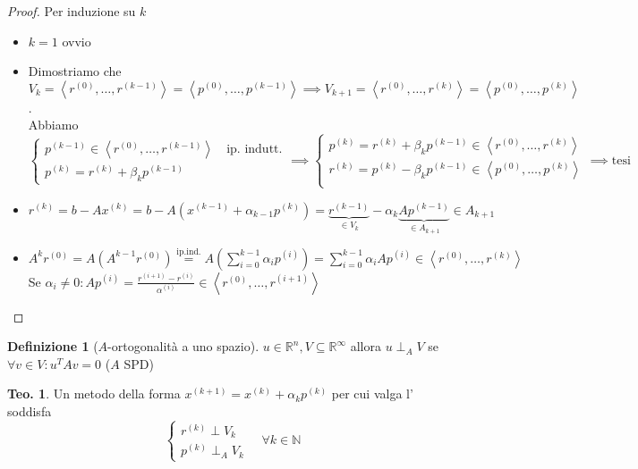 \documentclass[a4paper,10pt]{article}
\theoremstyle{definition}
\newcommand{\re}{\mathbb{R}} %
\theoremstyle{indentdefinition}
\newtheorem{defn}{Definizione}[section]
\theoremstyle{indenttheorem}
\newtheorem{thm}{Teo.}
\theoremstyle{myremark}
\theoremstyle{indentgeneral}
\theoremstyle{plain}
\theoremstyle{plain}
\newenvironment{myboxed} 
{\noindent\begin{lrbox}{\mybox}\begin{minipage}{\textwidth}}
{\end{minipage}\end{lrbox}\fbox{\usebox{\mybox}}}
\begin{document}
\begin{proof}
Per induzione su $k$ 
\begin{itemize}
    \item $k=1$ ovvio \\
    \item Dimostriamo che $V_{k}=\left\langle r^{\left(0\right)},\ldots,r^{\left(k-1\right)}\right\rangle=\left\langle p^{\left(0\right)},\ldots,p^{\left(k-1\right)}\right\rangle  \implies V_{k+1}=\left\langle r^{\left(0\right)},\ldots,r^{\left(k\right)}\right\rangle=\left\langle p^{\left(0\right)},\ldots,p^{\left(k\right)}\right\rangle$. \\
    Abbiamo
    $$\begin{cases}
        p^{(k-1)}\in \left\langle r^{(0)},\dots,r^{(k-1)}\right\rangle \quad \text{ip. indutt.}\\
        p^{(k)}=r^{(k)}+\beta_kp^{(k-1)}
    \end{cases}\implies\begin{cases}
        p^{(k)}=r^{(k)}+\beta_kp^{(k-1)}\in \left\langle r^{(0)},\dots,r^{(k)}\right\rangle \\
         r^{(k)}=p^{(k)}-\beta_kp^{(k-1)}\in \left\langle p^{(0)},\dots,p^{(k)}\right\rangle \\
    \end{cases}\implies\text{tesi}$$
    \item $r^{(k)}=b-Ax^{(k)}=b-A(x^{(k-1)}+\alpha_{k-1}p^{(k)})=\underbrace{r^{(k-1)}}_{\in V_k}-\alpha_k\underbrace{Ap^{(k-1)}}_{\in A_{k+1}}\in A_{k+1}$
    \item $A^kr^{(0)}=A(A^{k-1}r^{(0)})\overset{\text{ip.ind.}}{=}A(\sum_{i=0}^{k-1}\alpha_ip^{(i)})=\sum_{i=0}^{k-1}\alpha_iAp^{(i)}\in \left\langle r^{(0)},\dots,r^{(k)}\right\rangle $ \\
    Se $\alpha_i\ne 0: Ap^{(i)}=\frac{r^{(i+1)}-r^{(i)}}{\alpha^{(i)}}\in \left\langle r^{(0)},\dots,r^{(i+1)}\right\rangle  $
\end{itemize}
\end{proof}

\begin{defn}[$A$-ortogonalità a uno spazio]
\label{rem:A-ortogonalita} $u\in\re^n, V\subseteq\re^\infty$ allora $u\perp_AV$ se $\forall v\in V: u^TAv=0$ ($A$ SPD)
\end{defn}

\begin{myboxed}
\begin{thm}
\label{thm:ortogonalita-spazio-Krylov}Un metodo della forma $x^{\left(k+1\right)}=x^{\left(k\right)}+\alpha_{k}p^{\left(k\right)}$
per cui valga l' soddisfa
$$\begin{cases}
r^{(k)}\perp V_k \\
p^{(k)}\perp_AV_k
\end{cases}\quad   \forall k\in \mathbb{N}$$
\end{thm}
\end{myboxed}
\end{document}
